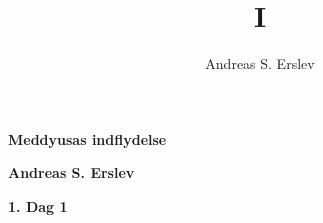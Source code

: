 \documentclass[]{article}
\title{I}
\author{Andreas S. Erslev}
\begin{document}
\begin{center}
	\Large\textbf{Meddyusas indflydelse}
\end{center}

\begin{center}
	\large\textbf{Andreas S. Erslev}
\end{center}

\begin{center}
	\large\textbf{1. Dag 1}
\end{center}
\end{document}
